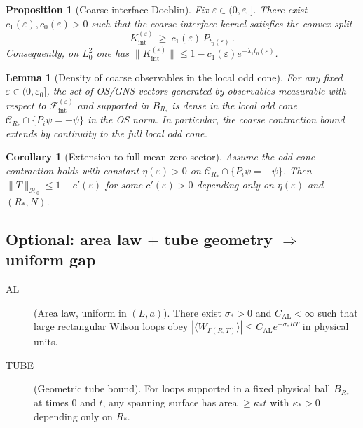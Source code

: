 \documentclass[11pt]{amsart}
\theoremstyle{plain}
\newtheorem{lemma}[theorem]{Lemma}
\newtheorem{proposition}[theorem]{Proposition}
\newtheorem{corollary}[theorem]{Corollary}
\theoremstyle{definition}
\theoremstyle{remark}
\begin{document}
\begin{proposition}[Coarse interface Doeblin]\label{prop:coarse-doeblin}
Fix $\varepsilon\in(0,\varepsilon_0]$. There exist $c_1(\varepsilon),c_0(\varepsilon)>0$ such that the coarse interface kernel satisfies the convex split
\[
  K_{\mathrm{int}}^{(\varepsilon)}\ \ge\ c_1(\varepsilon)\, P_{t_0(\varepsilon)}\,.
\]
Consequently, on $L_0^2$ one has $\|K_{\mathrm{int}}^{(\varepsilon)}\|\le 1- c_1(\varepsilon) e^{-\lambda_1 t_0(\varepsilon)}$.
\end{proposition}

\begin{lemma}[Density of coarse observables in the local odd cone]\label{lem:coarse-density}
For any fixed $\varepsilon\in(0,\varepsilon_0]$, the set of OS/GNS vectors generated by observables measurable with respect to $\mathcal F_{\mathrm{int}}^{(\varepsilon)}$ and supported in $B_{R_*}$ is dense in the local odd cone $\mathcal C_{R_*}\cap\{P_i\psi=-\psi\}$ in the OS norm. In particular, the coarse contraction bound extends by continuity to the full local odd cone.
\end{lemma}

\begin{corollary}[Extension to full mean-zero sector]\label{cor:odd-to-meanzero}
Assume the odd-cone contraction holds with constant $\eta(\varepsilon)>0$ on $\mathcal C_{R_*}\cap\{P_i\psi=-\psi\}$. Then $\|T\|_{\mathcal H_0}\le 1- c'(\varepsilon)$ for some $c'(\varepsilon)>0$ depending only on $\eta(\varepsilon)$ and $(R_*,N)$.
\end{corollary}

\subsection*{Optional: area law $+$ tube geometry $\Rightarrow$ uniform gap}

\begin{description}
\item[AL] (Area law, uniform in $(L,a)$). There exist $\sigma_*>0$ and $C_{\mathrm{AL}}<\infty$ such that large rectangular Wilson loops obey $|\langle W_{\Gamma(R,T)}\rangle|\le C_{\mathrm{AL}} e^{-\sigma_* RT}$ in physical units.
\item[TUBE] (Geometric tube bound). For loops supported in a fixed physical ball $B_{R_*}$ at times $0$ and $t$, any spanning surface has area $\ge \kappa_* t$ with $\kappa_*>0$ depending only on $R_*$. 
\end{description}
\end{document}
